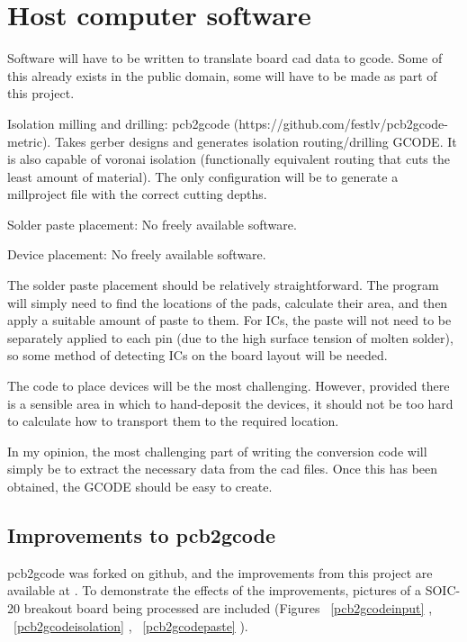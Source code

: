 \section{Host computer software}
Software will have to be written to translate board cad data to gcode. Some of this already exists in the public domain, some will have to be made
as part of this project.

Isolation milling and drilling: pcb2gcode (https://github.com/festlv/pcb2gcode-metric). Takes gerber designs and generates isolation routing/drilling
GCODE. It is also capable of voronai isolation (functionally equivalent routing that cuts the least amount of material). The only configuration
will be to generate a millproject file with the correct cutting depths.

Solder paste placement: No freely available software.

Device placement: No freely available software.

The solder paste placement should be relatively straightforward. The program will simply need to find the locations of the pads, calculate their
area, and then apply a suitable amount of paste to them. For ICs, the paste will not need to be separately applied to each pin (due to the high
surface tension of molten solder), so some method of detecting ICs on the board layout will be needed.

The code to place devices will be the most challenging. However, provided there is a sensible area in which to hand-deposit the devices, it should
not be too hard to calculate how to transport them to the required location.

In my opinion, the most challenging part of writing the conversion code will simply be to extract the necessary data from the cad files. Once this
has been obtained, the GCODE should be easy to create.

\subsection{Improvements to pcb2gcode}
pcb2gcode was forked on github, and the improvements from this project are available at \cite{github}.
To demonstrate the effects of the improvements, pictures of a SOIC-20 breakout board being processed are included (Figures ~\ref{pcb2gcodeinput} , ~\ref{pcb2gcodeisolation} , ~\ref{pcb2gcodepaste} ).

